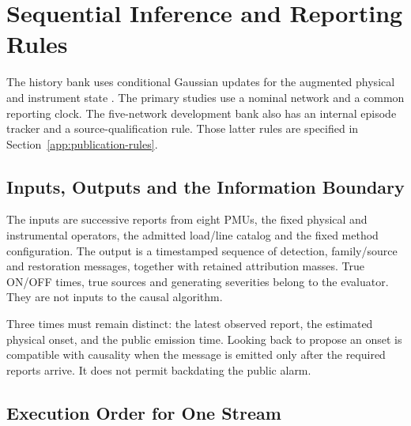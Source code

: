 \section{Sequential Inference and Reporting Rules}
\label{app:causal-walkthrough}

The history bank uses conditional Gaussian updates for the augmented
physical and instrument state \cite{sarkka2013bayesian}. The primary
studies use a nominal network and a common reporting clock. The
five-network development bank also has an internal episode tracker
and a source-qualification rule. Those latter rules are specified in
Section~\ref{app:publication-rules}.

\subsection{Inputs, Outputs and the Information Boundary}

The inputs are successive reports from eight PMUs, the fixed physical and
instrumental operators, the admitted load/line catalog and the fixed
method configuration. The output is a timestamped sequence of detection,
family/source and restoration messages, together with retained attribution
masses. True ON/OFF times, true sources and generating severities belong
to the evaluator. They are not inputs to the causal algorithm.

Three times must remain distinct: the latest observed report, the estimated
physical onset, and the public emission time. Looking back to propose an
onset is compatible with causality when the message is emitted only after
the required reports arrive. It does not permit backdating the public alarm.

\subsection{Execution Order for One Stream}

